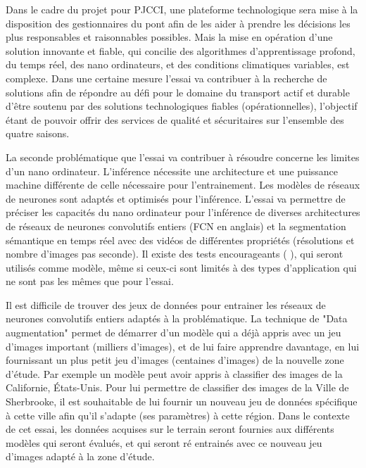 ﻿\par Dans le cadre du projet pour PJCCI, une plateforme technologique sera mise à la disposition des gestionnaires du pont afin de les aider à prendre les décisions les plus responsables et raisonnables possibles. Mais la mise en opération d'une solution innovante et fiable, qui concilie des algorithmes d'apprentissage profond, du temps réel, des nano ordinateurs, et des conditions climatiques variables, est complexe. Dans une certaine mesure l'essai va contribuer à la recherche de solutions afin de répondre au défi pour le domaine du transport actif et durable d'être soutenu par des solutions technologiques fiables (opérationnelles), l'objectif étant de pouvoir offrir des services de qualité et sécuritaires sur l'ensemble des quatre saisons.
\par La seconde problématique que l'essai va contribuer à résoudre concerne les limites d'un nano ordinateur. L'inférence nécessite une architecture et une puissance machine différente de celle nécessaire pour l'entrainement. Les modèles de réseaux de neurones sont adaptés et optimisés pour l'inférence. L'essai va permettre de préciser les capacités du nano ordinateur pour l'inférence de diverses architectures de réseaux de neurones convolutifs entiers (FCN en anglais) et la segmentation sémantique en temps réel avec des vidéos de différentes propriétés (résolutions et nombre d'images pas seconde). Il existe des tests encourageants (\cite{nvidia_jetson_2019-1} \cite{nguyen_mavnet_2019} \cite{chong_real-time_1992}), qui seront utilisés comme modèle, même si ceux-ci sont limités à des types d'application qui ne sont pas les mêmes que pour l'essai.
\par Il est difficile de trouver des jeux de données pour entrainer les réseaux de neurones convolutifs entiers adaptés à la problématique. La technique de "Data augmentation" permet de démarrer d'un modèle qui a déjà appris avec un jeu d'images important (milliers d'images), et de lui faire apprendre davantage, en lui fournissant un plus petit jeu d'images (centaines d'images) de la nouvelle zone d'étude. Par exemple un modèle peut avoir appris à classifier des images de la Californie, États-Unis. Pour lui permettre de classifier des images de la Ville de Sherbrooke, il est souhaitable de lui fournir un nouveau jeu de données spécifique à cette ville afin qu'il s'adapte (ses paramètres) à cette région. Dans le contexte de cet essai, les données acquises sur le terrain seront fournies aux différents modèles qui seront évalués, et qui seront ré entrainés avec ce nouveau jeu d'images adapté à la zone d'étude.
